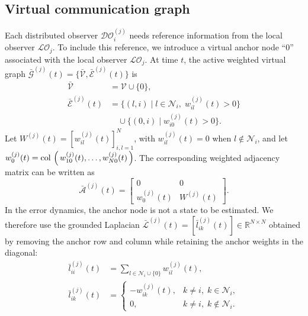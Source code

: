 \documentclass[journal,twoside]{IEEEtran}
\def\col#1{\mathop{{\rm col}\,\left(\,#1\,\right)}}
\def\V{\mathcal{V}} %
\def\E{\mathcal{E}} %
\def\G{\mathcal{G}} %
\def\A{\mathcal{A}} %
\def\L{\mathcal{L}} %
\def\N{\mathcal{N}} %
\def\LO{\mathcal{LO}} %
\def\DO{\mathcal{DO}} %
\begin{document}
\subsection{Virtual communication graph}
Each distributed observer $\DO_{i}^{(j)}$ needs reference information from the local observer $\LO_{j}$.
    To include this reference, we introduce a virtual anchor node ``0'' associated with the local observer $\LO_j$. At time $t$, the active weighted virtual graph $\bar{\G}^{(j)}(t)=\{\bar{\V},\bar{\E}^{(j)}(t)\}$ is
    \begin{equation}
        \begin{aligned}
            \bar{\V} &= \V \cup \{0\}, \\
            \bar{\E}^{(j)}(t)
            &= \{(l,i)\mid l\in\N_i,\; w_{il}^{(j)}(t)>0\}\\
            &\quad\cup \{(0,i)\mid w_{i0}^{(j)}(t)>0\}.
        \end{aligned}
    \end{equation}
    Let $W^{(j)}(t)=[w_{il}^{(j)}(t)]_{i,l=1}^{N}$, with $w_{il}^{(j)}(t)=0$ when $l\notin\N_i$, and let
    $w_{0}^{(j)}(t)=\col{w_{10}^{(j)}(t),\ldots,w_{N0}^{(j)}(t)}$.
    The corresponding weighted adjacency matrix can be written as
    \begin{equation}
        \bar{\A}^{(j)}(t)  = \begin{bmatrix} 0 & 0 \\
                        w_{0}^{(j)}(t) & W^{(j)}(t) \end{bmatrix}.
    \end{equation}
    In the error dynamics, the anchor node is not a state to be estimated. We therefore use the grounded Laplacian
    $\bar{\L}^{(j)}(t)=[\bar l_{ik}^{(j)}(t)]\in\mathbb{R}^{N\times N}$ obtained by removing the anchor row and column while retaining the anchor weights in the diagonal:
    \begin{equation}
        \begin{aligned}
    \bar{l}_{ii}^{(j)}(t) &=\sum_{l\in \N_i\cup\{0\}} w_{il}^{(j)}(t),\\
    \bar{l}_{ik}^{(j)}(t)&=
    \begin{cases}
    -w_{ik}^{(j)}(t), & k\neq i,\; k\in\N_i,\\
    0, & k\neq i,\; k\notin\N_i.
    \end{cases}
    \end{aligned}
\end{equation}
\end{document}
